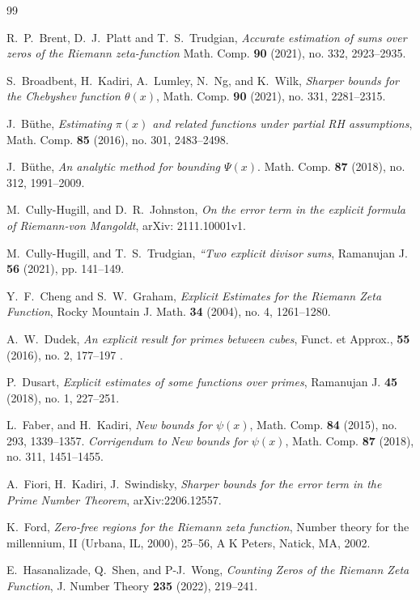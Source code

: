 \documentclass[10pt]{amsart}
\theoremstyle{definition}
\numberwithin{equation}{section}
\begin{document}
\begin{thebibliography}{99}

R.~P.~Brent, D.~J.~Platt and T.~S.~Trudgian, 
{\it Accurate estimation of sums over zeros of the Riemann zeta-function}
 Math. Comp. {\bf 90} (2021), no. 332, 2923--2935. 
 
S.~Broadbent, H.~Kadiri, A.~Lumley, N.~Ng, and K.~Wilk, 
{\it Sharper bounds for the Chebyshev function $\theta(x)$},
Math. Comp. {\bf 90} (2021), no. 331, 2281--2315.

J.~B{\"u}the, 
{\it Estimating $\pi(x)$ and related functions under partial RH assumptions}, 
Math. Comp. {\bf 85} (2016), no. 301, 2483--2498.

J.~B{\"u}the, 
{\it An analytic method for bounding $\Psi(x)$}. 
Math. Comp. {\bf 87} (2018), no. 312, 1991--2009.

M.~Cully-Hugill, and D.~R.~Johnston,
 {\it On the error term in the explicit formula of Riemann-von Mangoldt}, 
arXiv: 2111.10001v1.

M.~Cully-Hugill, and  T.~S.~Trudgian,  
{\it  “Two explicit divisor sums},
Ramanujan J. {\bf 56} (2021), pp. 141–149.

Y.~F.~Cheng and S.~W.~Graham,
{\it Explicit Estimates for the Riemann Zeta Function}, 
Rocky Mountain J. Math. {\bf 34} (2004), no. 4, 1261--1280.

A.~W.~Dudek, 
{\it An explicit result for primes between cubes}, 
Funct. et Approx., {\bf 55} (2016), no. 2, 177--197 .

P.~Dusart, 
{\it Explicit estimates of some functions over primes}, 
Ramanujan J. {\bf 45} (2018), no. 1, 227--251.

L.~Faber, and H.~Kadiri,
{\it New bounds for $\psi(x)$}, 
Math. Comp. {\bf 84} (2015), no. 293, 1339--1357.
{\it Corrigendum to New bounds for $\psi(x)$}, Math. Comp. {\bf 87} (2018), no. 311, 1451--1455. 

A.~Fiori, H.~Kadiri, J.~Swindisky, 
{\it Sharper bounds for the error term in the Prime Number Theorem}, arXiv:2206.12557. 

 K.~Ford, {\it Zero-free regions for the Riemann zeta function}, 
 Number theory for the millennium, II (Urbana, IL, 2000), 25--56, A K Peters, Natick, MA, 2002. 

E.~Hasanalizade, Q.~Shen, and P-J.~Wong,
{\it Counting Zeros of the Riemann Zeta Function},
 J. Number Theory {\bf 235} (2022), 219--241.
 

\end{thebibliography}
\end{document}
